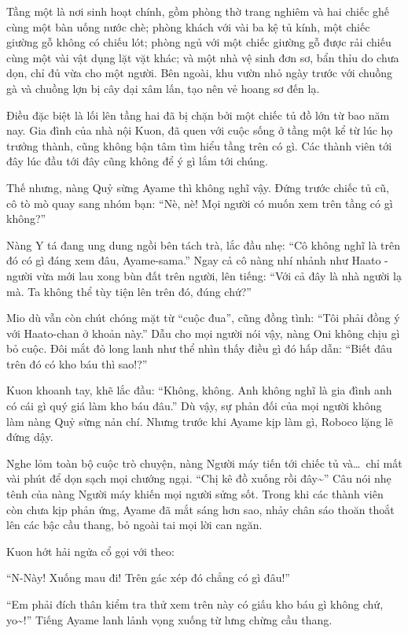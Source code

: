\documentclass[../main.tex]{subfiles}
\begin{document}
Tầng một là nơi sinh hoạt chính, gồm phòng thờ trang nghiêm và hai chiếc ghế cùng một bàn uống nước chè; phòng khách với vài ba kệ tủ kính, một chiếc giường gỗ không có chiếu lót; phòng ngủ với một chiếc giường gỗ được rải chiếu cùng một vài vật dụng lặt vặt khác; và một nhà vệ sinh đơn sơ, bẩn thỉu do chưa dọn, chỉ đủ vừa cho một người. Bên ngoài, khu vườn nhỏ ngày trước với chuồng gà và chuồng lợn bị cây dại xâm lấn, tạo nên vẻ hoang sơ đến lạ.

Điều đặc biệt là lối lên tầng hai đã bị chặn bởi một chiếc tủ đồ lớn từ bao năm nay. Gia đình của nhà nội Kuon, đã quen với cuộc sống ở tầng một kể từ lúc họ trưởng thành, cũng không bận tâm tìm hiểu tầng trên có gì. Các thành viên tới đây lúc đầu tới đây cũng không để ý gì lắm tới chúng.

Thế nhưng, nàng Quỷ sừng Ayame thì không nghĩ vậy. Đứng trước chiếc tủ cũ, cô tò mò quay sang nhóm bạn: ``Nè, nè! Mọi người có muốn xem trên tầng có gì không?''

Nàng Y tá đang ung dung ngồi bên tách trà, lắc đầu nhẹ: ``Cô không nghĩ là trên đó có gì đáng xem đâu, Ayame-sama.'' Ngay cả cô nàng nhí nhảnh như Haato - người vừa mới lau xong bùn đất trên người, lên tiếng: ``Với cả đây là nhà người lạ mà. Ta không thể tùy tiện lên trên đó, đúng chứ?''

Mio dù vẫn còn chút chóng mặt từ ``cuộc đua'', cũng đồng tình: ``Tôi phải đồng ý với Haato-chan ở khoản này.'' Dẫu cho mọi người nói vậy, nàng Oni không chịu gì bỏ cuộc. Đôi mắt đỏ long lanh như thể nhìn thấy điều gì đó hấp dẫn: ``Biết đâu trên đó có kho báu thì sao!?''

Kuon khoanh tay, khẽ lắc đầu: ``Không, không. Anh không nghĩ là gia đình anh có cái gì quý giá làm kho báu đâu.'' Dù vậy, sự phản đối của mọi người không làm nàng Quỷ sừng nản chí. Nhưng trước khi Ayame kịp làm gì, Roboco lặng lẽ đứng dậy.

Nghe lỏm toàn bộ cuộc trò chuyện, nàng Người máy tiến tới chiếc tủ và\dots\ chỉ mất vài phút để dọn sạch mọi chướng ngại. ``Chị kê đồ xuống rồi đây\~{}'' Câu nói nhẹ tênh của nàng Người máy khiến mọi người sửng sốt. Trong khi các thành viên còn chưa kịp phản ứng, Ayame đã mắt sáng hơn sao, nhảy chân sáo thoăn thoắt lên các bậc cầu thang, bỏ ngoài tai mọi lời can ngăn.

Kuon hớt hải ngửa cổ gọi với theo:

``N-Này! Xuống mau đi! Trên gác xép đó chẳng có gì đâu!''

``Em phải đích thân kiểm tra thử xem trên này có giấu kho báu gì không chứ, yo\~{}!'' Tiếng Ayame lanh lảnh vọng xuống từ lưng chừng cầu thang.
\end{document}
